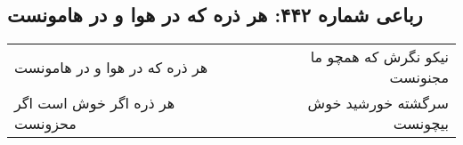 \begin{center}
\section*{رباعی شماره ۴۴۲: هر ذره که در هوا و در هامونست}
\label{sec:0442}
\begin{longtable}{l p{0.5cm} r}
هر ذره که در هوا و در هامونست
&&
نیکو نگرش که همچو ما مجنونست
\\
هر ذره اگر خوش است اگر محزونست
&&
سرگشته خورشید خوش بیچونست
\\
\end{longtable}
\end{center}
